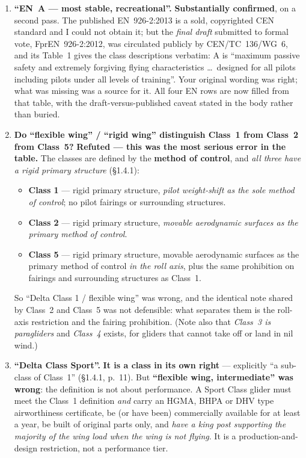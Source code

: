 \documentclass[11pt,a4paper]{article}
\newcommand{\verdict}[1]{\textbf{\textcolor{vbad}{#1}}}
\newcommand{\ok}[1]{\textbf{\textcolor{vgood}{#1}}}
\begin{document}
\begin{enumerate}[leftmargin=1.4em, itemsep=0.5em]
\item \textbf{\enquote{EN~A --- most stable, recreational}.} \ok{Substantially confirmed},
  on a second pass. The published EN~926-2:2013 is a sold, copyrighted CEN standard and I
  could not obtain it; but the \emph{final draft} submitted to formal vote,
  FprEN~926-2:2012, was circulated publicly by CEN/TC~136/WG~6, and its Table~1 gives the
  class descriptions verbatim: A is \enquote{maximum passive safety and extremely
  forgiving flying characteristics \dots\ designed for all pilots including pilots under
  all levels of training}. Your original wording was right; what was missing was a source
  for it. All four EN rows are now filled from that table, with the draft-versus-published
  caveat stated in the body rather than buried.

\item \textbf{Do \enquote{flexible wing} / \enquote{rigid wing} distinguish Class~1 from
  Class~2 from Class~5?} \verdict{Refuted --- this was the most serious error in the table.}
  The classes are defined by the \textbf{method of control}, and \emph{all three have a
  rigid primary structure} (\S1.4.1):
  \begin{itemize}[nosep, leftmargin=1.2em]
    \item \textbf{Class 1} --- rigid primary structure, \emph{pilot weight-shift as the
      sole method of control}; no pilot fairings or surrounding structures.
    \item \textbf{Class 2} --- rigid primary structure, \emph{movable aerodynamic surfaces
      as the primary method of control}.
    \item \textbf{Class 5} --- rigid primary structure, movable aerodynamic surfaces as the
      primary method of control \emph{in the roll axis}, plus the same prohibition on
      fairings and surrounding structures as Class~1.
  \end{itemize}
  So \enquote{Delta Class 1 / flexible wing} was wrong, and the identical note shared by
  Class~2 and Class~5 was not defensible: what separates them is the roll-axis restriction
  and the fairing prohibition. (Note also that \emph{Class~3 is paragliders} and
  \emph{Class~4} exists, for gliders that cannot take off or land in nil wind.)

\item \textbf{\enquote{Delta Class Sport}.} \ok{It is a class in its own right} ---
  explicitly \enquote{a sub-class of Class~1} (\S1.4.1, p.~11). But
  \verdict{\enquote{flexible wing, intermediate} was wrong}: the definition is not about
  performance. A Sport Class glider must meet the Class~1 definition \emph{and} carry an
  HGMA, BHPA or DHV type airworthiness certificate, be (or have been) commercially
  available for at least a year, be built of original parts only, and \emph{have a king
  post supporting the majority of the wing load when the wing is not flying}. It is a
  production-and-design restriction, not a performance tier.


\end{enumerate}
\end{document}
